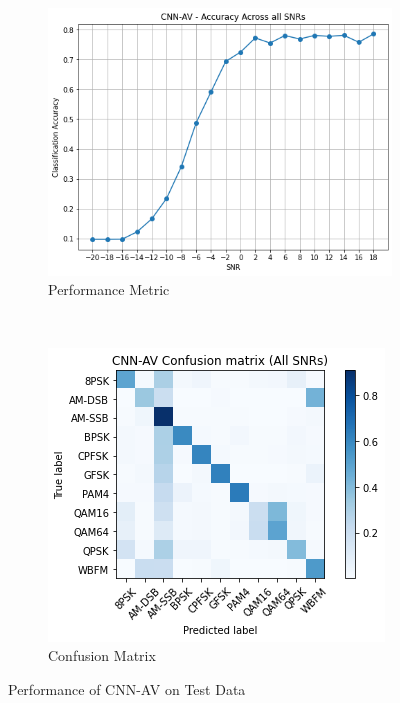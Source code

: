 \documentclass[journal,onecolumn]{IEEEtran}
\begin{document}
\begin{figure}[h]
    \centering
    \begin{subfigure}[b]{0.5\textwidth}
        \centering
        \includegraphics[scale=0.5]{cnnACCSNR}
        \caption{Performance Metric}
        \label{cnnACCSNR}
    \end{subfigure}%
    ~ 
    \begin{subfigure}[b]{0.5\textwidth}
        \centering
        \includegraphics[scale=0.7]{cnnoverallConfMat}
        \caption{Confusion Matrix}
    \end{subfigure}
    \caption{Performance of CNN-AV on Test Data}
    \label{cnnConfMat}
\end{figure}
\end{document}
